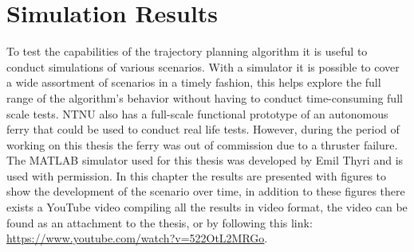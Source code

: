 \blankpage
\section{Simulation Results}


To test the capabilities of the trajectory planning algorithm it is useful to conduct simulations of various scenarios.
With a simulator it is possible to cover a wide assortment of scenarios in a timely fashion, this helps explore the full
range of the algorithm's behavior without having to conduct time-consuming full scale tests. NTNU also has a full-scale
functional prototype of an autonomous ferry that could be used to conduct real life tests. However, during the period of working
on this thesis the ferry was out of commission due to a thruster failure.
The MATLAB simulator used for this thesis was developed by Emil Thyri and is used with permission. In this chapter the results
are presented with figures to show the development of the scenario over time, in addition to these figures there exists a YouTube video compiling
all the results in video format, the video can be found as an attachment to the thesis, or by following this link: \url{https://www.youtube.com/watch?v=522OtL2MRGo}.

